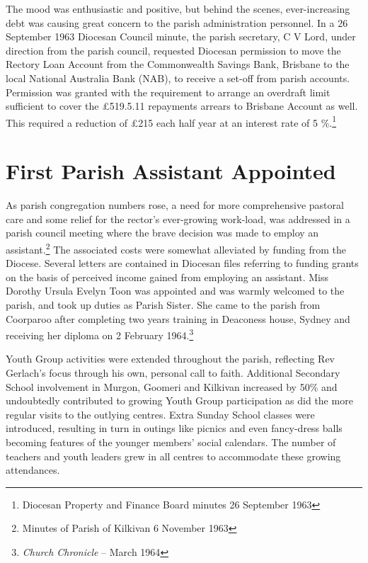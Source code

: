 The mood was enthusiastic and positive, but behind the scenes, ever-increasing debt was causing great concern to the parish administration personnel. In a 26 September 1963 Diocesan Council minute, the parish secretary, C V Lord, under direction from the parish council, requested Diocesan permission to move the Rectory Loan Account from the Commonwealth Savings Bank, Brisbane to the local National Australia Bank (NAB), to receive a set-off from parish accounts. Permission was granted with the requirement to arrange an overdraft limit sufficient to cover the \pounds519.5.11 repayments arrears to Brisbane Account as well. This required a reduction of \pounds215 each half year at an interest rate of 5  \%.\footnote{Diocesan Property and Finance Board minutes 26 September 1963}


\section{First Parish Assistant Appointed}



As parish congregation numbers rose, a need for more comprehensive pastoral care and some relief for the rector's ever-growing work-load, was addressed in a parish council meeting where the brave decision was made to employ an assistant.\footnote{Minutes of Parish of Kilkivan 6 November 1963} The associated costs were somewhat alleviated by funding from the Diocese. Several letters are contained in Diocesan files referring to funding grants on the basis of perceived income gained from employing an assistant. Miss Dorothy Ursula Evelyn Toon was appointed and was warmly welcomed to the parish, and took up duties as Parish Sister. She came to the parish from Coorparoo after completing two years training in Deaconess house, Sydney and receiving her diploma on 2 February 1964.\footnote{\emph{Church Chronicle} -- March 1964}


Youth Group activities were extended throughout the parish, reflecting Rev Gerlach's focus through his own, personal call to faith. Additional Secondary School involvement in Murgon, Goomeri and Kilkivan increased by 50\% and undoubtedly contributed to growing Youth Group participation as did the more regular visits to the outlying centres. Extra Sunday School classes were introduced, resulting in turn in outings like picnics and even fancy-dress balls becoming features of the younger members' social calendars. The number of teachers and youth leaders grew in all centres to accommodate these growing attendances.



